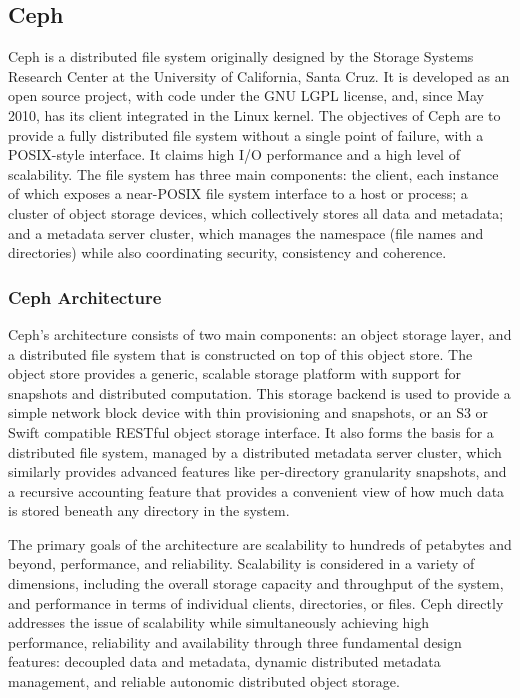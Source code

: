 \documentclass[11pt]{article}
\begin{document}
\subsection{Ceph}
Ceph is a distributed file system originally designed by the Storage 
Systems Research Center at the University of California, Santa Cruz. 
It is developed as an open source project, with code under the GNU LGPL 
license, and, since May 2010, has its client integrated in the Linux 
kernel. The objectives of Ceph are to provide a fully distributed file 
system without a single point of failure, with a POSIX-style interface. 
It claims high I/O performance and a high level of scalability. The 
file system has three main components: the client, each instance of 
which exposes a near-POSIX file system interface to a host or process; 
a cluster of object storage devices, which collectively stores all 
data and metadata; and a metadata server cluster, which manages the 
namespace (file names and directories) while also coordinating 
security, consistency and coherence.

\subsubsection{Ceph Architecture}
Ceph's architecture consists of two main components: an object storage 
layer, and a distributed file system that is constructed on top of 
this object store. The object store provides a generic, scalable 
storage platform with support for snapshots and distributed computation. 
This storage backend is used to provide a simple network block device  
with thin provisioning and snapshots, or an S3 or Swift compatible RESTful 
object storage interface. It also forms the basis for a distributed file 
system, managed by a distributed metadata server cluster, which similarly 
provides advanced features like per-directory granularity snapshots, and a 
recursive accounting feature that provides a convenient view of how much 
data is stored beneath any directory in the system.

The primary goals of the architecture are scalability to hundreds of 
petabytes and beyond, performance, and reliability. Scalability is 
considered in a variety of dimensions, including the overall storage 
capacity and throughput of the system, and performance in terms of 
individual clients, directories, or files. Ceph directly addresses the 
issue of scalability while simultaneously achieving high performance, 
reliability and availability through three fundamental design features: 
decoupled data and metadata, dynamic distributed metadata management, 
and reliable autonomic distributed object storage.
\end{document}
